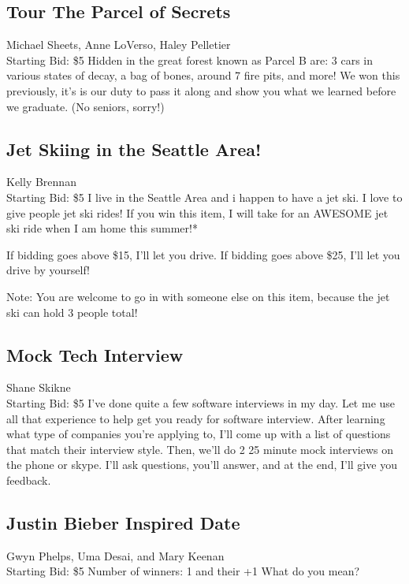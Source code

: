 \documentclass[11pt]{article}
\begin{document}
\subsection{Tour The Parcel of Secrets}
Michael Sheets, Anne LoVerso, Haley Pelletier
\\
Starting Bid: \$5
\newline
Hidden in the great forest known as Parcel B are: 3 cars in various states of decay, a bag of bones, around 7 fire pits, and more! We won this previously, it's is our duty to pass it along and show you what we learned before we graduate. (No seniors, sorry!)
\subsection{Jet Skiing in the Seattle Area!}
Kelly Brennan
\\
Starting Bid: \$5
\newline
I live in the Seattle Area and i happen to have a jet ski. I love to give people jet ski rides! If you win this item, I will take for an AWESOME jet ski ride when I am home this summer!* 

If bidding goes above \$15, I'll let you drive. If bidding goes above \$25, I'll let you drive by yourself! 

Note: You are welcome to go in with someone else on this item, because the jet ski can hold 3 people total!
\subsection{Mock Tech Interview}
Shane Skikne
\\
Starting Bid: \$5
\newline
I've done quite a few software interviews in my day. Let me use all that experience to help get you ready for software interview. After learning what type of companies you're applying to, I'll come up with a list of questions that match their interview style. Then, we'll do 2 25 minute mock interviews on the phone or skype. I'll ask questions, you'll answer, and at the end, I'll give you feedback.
\subsection{Justin Bieber Inspired Date}
Gwyn Phelps, Uma Desai, and Mary Keenan
\\
Starting Bid: \$5
\newline
Number of winners: 1 and their +1
\newline
What do you mean?
\end{document}

